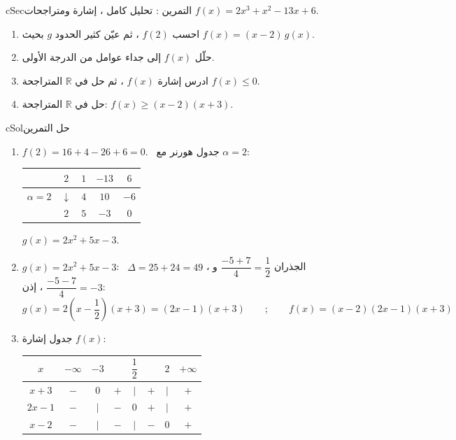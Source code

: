 \documentclass[12pt,a4paper]{article}
\newenvironment{BOX}[2]{\begin{otherlanguage}{english}\begin{arbox}{#1}{#2}}{\end{arbox}\end{otherlanguage}}
\newcounter{exo}
\newenvironment{tamrin}[1]{\stepcounter{exo}\begin{BOX}{cSec}{التمرين \theexo: #1}}{\end{BOX}}
\newenvironment{hal}{\Needspace{12\baselineskip}\begin{otherlanguage}{english}\begin{arbox}[breakable]{cSol}{حل التمرين \theexo}}{\end{arbox}\end{otherlanguage}}
\newenvironment{LTR}{\begin{otherlanguage}{english}}{\end{otherlanguage}}
\newcommand{\R}{\mathbb{R}}
\begin{document}
\begin{tamrin}{تحليل كامل ، إشارة ومتراجحات}
$f(x)=2x^3+x^2-13x+6$.
\begin{enumerate}
\item احسب $f(2)$ ، ثم عيّن كثير الحدود $g$ بحيث $f(x)=(x-2)\,g(x)$.
\item حلّل $f(x)$ إلى جداء عوامل من الدرجة الأولى.
\item ادرس إشارة $f(x)$ ، ثم حل في $\R$ المتراجحة $f(x)\le0$.
\item حل في $\R$ المتراجحة: $f(x)\ge(x-2)(x+3)$.
\end{enumerate}
\end{tamrin}
\begin{hal}
\begin{enumerate}
\item $f(2)=16+4-26+6=0$. \ جدول هورنر مع $\alpha=2$:
\begin{center}
\begin{LTR}
\renewcommand{\arraystretch}{1.5}
\begin{tabular}{|c|c|c|c|c|}\hline
\cellcolor{cDef!15} & \cellcolor{cDef!15}$2$ & \cellcolor{cDef!15}$1$ & \cellcolor{cDef!15}$-13$ & \cellcolor{cDef!15}$6$\\\hline
\cellcolor{cEx!25}$\alpha=2$ & $\downarrow$ & $4$ & $10$ & $-6$\\\hline
 & \cellcolor{cSol!15}$2$ & \cellcolor{cSol!15}$5$ & \cellcolor{cSol!15}$-3$ & \cellcolor{cThm!20}$0$\\\hline
\end{tabular}
\end{LTR}
\end{center}
$\boxed{g(x)=2x^2+5x-3}$.
\item $g(x)=2x^2+5x-3$: \ $\Delta=25+24=49$ ، الجذران $\dfrac{-5+7}{4}=\dfrac12$ و $\dfrac{-5-7}{4}=-3$ ، إذن:
\[g(x)=2\left(x-\dfrac12\right)(x+3)=(2x-1)(x+3)\qquad;\qquad\boxed{f(x)=(x-2)(2x-1)(x+3)}\]
\item جدول إشارة $f(x)$:
\begin{center}
\renewcommand{\arraystretch}{1.4}
\begin{tabular}{|C|C|C|C|C|C|C|C|}\hline
{}$x$ & $-\infty$ \quad & $-3$ & & $\dfrac12$ & & $2$ & \quad $+\infty$\\\hline
$x+3$ & $-$ & $0$ & $+$ & $\vert$ & $+$ & $\vert$ & $+$\\\hline
$2x-1$ & $-$ & $\vert$ & $-$ & $0$ & $+$ & $\vert$ & $+$\\\hline
$x-2$ & $-$ & $\vert$ & $-$ & $\vert$ & $-$ & $0$ & $+$\\\hline

\end{tabular}
\end{center}
\end{enumerate}
\end{hal}
\end{document}
